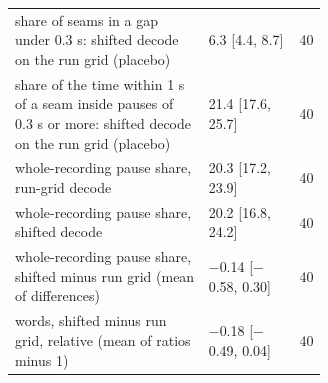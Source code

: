 {\begin{tabular}{@{}p{0.62\linewidth}lr@{}}
share of seams in a gap under 0.3 s: shifted decode on the run grid (placebo) & 6.3 [4.4, 8.7] & 40 \\
share of the time within 1 s of a seam inside pauses of 0.3 s or more: shifted decode on the run grid (placebo) & 21.4 [17.6, 25.7] & 40 \\
whole-recording pause share, run-grid decode & 20.3 [17.2, 23.9] & 40 \\
whole-recording pause share, shifted decode & 20.2 [16.8, 24.2] & 40 \\
whole-recording pause share, shifted minus run grid (mean of differences) & \ensuremath{-}0.14 [\ensuremath{-}0.58, 0.30] & 40 \\
words, shifted minus run grid, relative (mean of ratios minus 1) & \ensuremath{-}0.18 [\ensuremath{-}0.49, 0.04] & 40 \\
\bottomrule
\end{tabular}}
